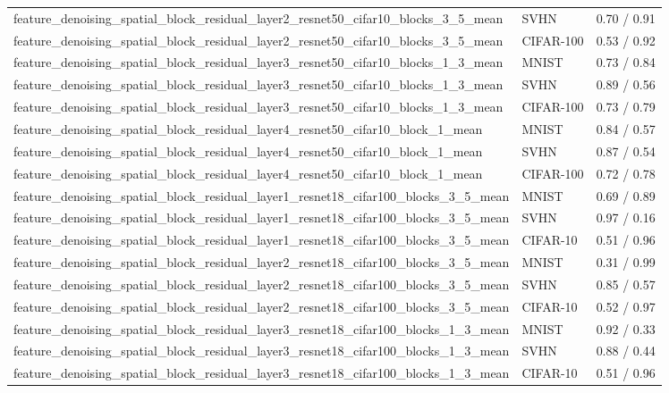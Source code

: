 \begin{tabular}{lll}
feature\_denoising\_spatial\_block\_residual\_layer2\_resnet50\_cifar10\_blocks\_3\_5\_mean & SVHN & 0.70 / 0.91 \\
feature\_denoising\_spatial\_block\_residual\_layer2\_resnet50\_cifar10\_blocks\_3\_5\_mean & CIFAR-100 & 0.53 / 0.92 \\
feature\_denoising\_spatial\_block\_residual\_layer3\_resnet50\_cifar10\_blocks\_1\_3\_mean & MNIST & 0.73 / 0.84 \\
feature\_denoising\_spatial\_block\_residual\_layer3\_resnet50\_cifar10\_blocks\_1\_3\_mean & SVHN & 0.89 / 0.56 \\
feature\_denoising\_spatial\_block\_residual\_layer3\_resnet50\_cifar10\_blocks\_1\_3\_mean & CIFAR-100 & 0.73 / 0.79 \\
feature\_denoising\_spatial\_block\_residual\_layer4\_resnet50\_cifar10\_block\_1\_mean & MNIST & 0.84 / 0.57 \\
feature\_denoising\_spatial\_block\_residual\_layer4\_resnet50\_cifar10\_block\_1\_mean & SVHN & 0.87 / 0.54 \\
feature\_denoising\_spatial\_block\_residual\_layer4\_resnet50\_cifar10\_block\_1\_mean & CIFAR-100 & 0.72 / 0.78 \\
feature\_denoising\_spatial\_block\_residual\_layer1\_resnet18\_cifar100\_blocks\_3\_5\_mean & MNIST & 0.69 / 0.89 \\
feature\_denoising\_spatial\_block\_residual\_layer1\_resnet18\_cifar100\_blocks\_3\_5\_mean & SVHN & 0.97 / 0.16 \\
feature\_denoising\_spatial\_block\_residual\_layer1\_resnet18\_cifar100\_blocks\_3\_5\_mean & CIFAR-10 & 0.51 / 0.96 \\
feature\_denoising\_spatial\_block\_residual\_layer2\_resnet18\_cifar100\_blocks\_3\_5\_mean & MNIST & 0.31 / 0.99 \\
feature\_denoising\_spatial\_block\_residual\_layer2\_resnet18\_cifar100\_blocks\_3\_5\_mean & SVHN & 0.85 / 0.57 \\
feature\_denoising\_spatial\_block\_residual\_layer2\_resnet18\_cifar100\_blocks\_3\_5\_mean & CIFAR-10 & 0.52 / 0.97 \\
feature\_denoising\_spatial\_block\_residual\_layer3\_resnet18\_cifar100\_blocks\_1\_3\_mean & MNIST & 0.92 / 0.33 \\
feature\_denoising\_spatial\_block\_residual\_layer3\_resnet18\_cifar100\_blocks\_1\_3\_mean & SVHN & 0.88 / 0.44 \\
feature\_denoising\_spatial\_block\_residual\_layer3\_resnet18\_cifar100\_blocks\_1\_3\_mean & CIFAR-10 & 0.51 / 0.96 \\

\end{tabular}
